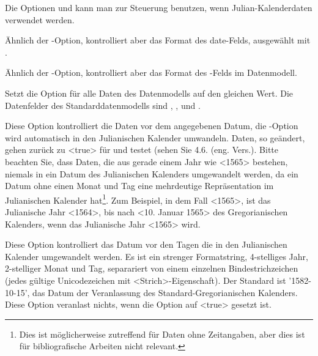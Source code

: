 \documentclass{ltxdockit}[2011/03/25]
\begin{document}
\begin{optionlist}
Die Optionen  und   kann man zur Steuerung benutzen, wenn Julian-Kalenderdaten verwendet werden.


Ähnlich der -Option, kontrolliert aber das Format des date-Felds, ausgewählt mit .


Ähnlich der -Option, kontrolliert aber das Format des 
-Felds im Datenmodell.


Setzt die Option für alle Daten des Datenmodells auf den gleichen Wert. Die Datenfelder
des Standarddatenmodells sind , , 
und .


Diese Option kontrolliert die Daten vor dem angegebenen Datum, die
-Option wird automatisch in den Julianischen Kalender umwandeln. Daten, so geändert, gehen zurück zu <true> für  und  testet (sehen Sie %
4.6. (eng. Vers.).
Bitte beachten Sie, dass Daten, die aus gerade einem Jahr wie  <1565> bestehen,
niemals in ein Datum des Julianischen Kalenders umgewandelt werden,  da ein Datum
ohne einen Monat und Tag eine mehrdeutige Repräsentation im Julianischen Kalender hat\footnote{Dies ist möglicherweise zutreffend für Daten ohne Zeitangaben, aber dies
ist für bibliografische Arbeiten nicht relevant.}. Zum Beispiel, in dem Fall <1565>, 
ist das Julianische Jahr <1564>, bis nach <10. Januar 1565> des Gregorianischen Kalenders, wenn das Julianische Jahr <1565> wird.


Diese Option kontrolliert das Datum vor den Tagen die in den Julianischen Kalender umgewandelt werden. Es ist ein strenger Formatstring, 4-stelliges Jahr, 
2-stelliger Monat und Tag, separariert von einem einzelnen Bindestrichzeichen
(jedes gültige Unicodezeichen mit <Strich>-Eigenschaft). Der Standard ist
'1582-10-15', das Datum der Veranlassung des Standard-Gregorianischen Kalenders. 
Diese Option veranlast nichts, wenn die Option  auf <true> gesetzt ist.


\end{optionlist}
\end{document}
